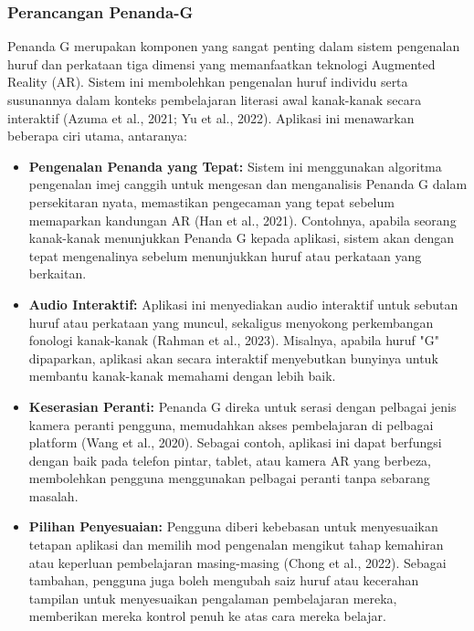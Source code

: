 \begin{itemize}
 
\subsubsection{{Perancangan Penanda-G}  }
Penanda G merupakan komponen yang sangat penting dalam sistem pengenalan huruf dan perkataan tiga dimensi yang memanfaatkan teknologi Augmented Reality (AR). Sistem ini membolehkan pengenalan huruf individu serta susunannya dalam konteks pembelajaran literasi awal kanak-kanak secara interaktif (Azuma et al., 2021; Yu et al., 2022). Aplikasi ini menawarkan beberapa ciri utama, antaranya:  \\
\begin{itemize}  
\item \textbf{Pengenalan Penanda yang Tepat:} Sistem ini menggunakan algoritma pengenalan imej canggih untuk mengesan dan menganalisis Penanda G dalam persekitaran nyata, memastikan pengecaman yang tepat sebelum memaparkan kandungan AR (Han et al., 2021). Contohnya, apabila seorang kanak-kanak menunjukkan Penanda G kepada aplikasi, sistem akan dengan tepat mengenalinya sebelum menunjukkan huruf atau perkataan yang berkaitan.  \\
\item \textbf{Audio Interaktif:} Aplikasi ini menyediakan audio interaktif untuk sebutan huruf atau perkataan yang muncul, sekaligus menyokong perkembangan fonologi kanak-kanak (Rahman et al., 2023). Misalnya, apabila huruf "G" dipaparkan, aplikasi akan secara interaktif menyebutkan bunyinya untuk membantu kanak-kanak memahami dengan lebih baik. \\ 
\item \textbf{Keserasian Peranti:} Penanda G direka untuk serasi dengan pelbagai jenis kamera peranti pengguna, memudahkan akses pembelajaran di pelbagai platform (Wang et al., 2020). Sebagai contoh, aplikasi ini dapat berfungsi dengan baik pada telefon pintar, tablet, atau kamera AR yang berbeza, membolehkan pengguna menggunakan pelbagai peranti tanpa sebarang masalah.  \\
\item \textbf{Pilihan Penyesuaian:} Pengguna diberi kebebasan untuk menyesuaikan tetapan aplikasi dan memilih mod pengenalan mengikut tahap kemahiran atau keperluan pembelajaran masing-masing (Chong et al., 2022). Sebagai tambahan, pengguna juga boleh mengubah saiz huruf atau kecerahan tampilan untuk menyesuaikan pengalaman pembelajaran mereka, memberikan mereka kontrol penuh ke atas cara mereka belajar.\\  



\end{itemize}
\end{itemize}
